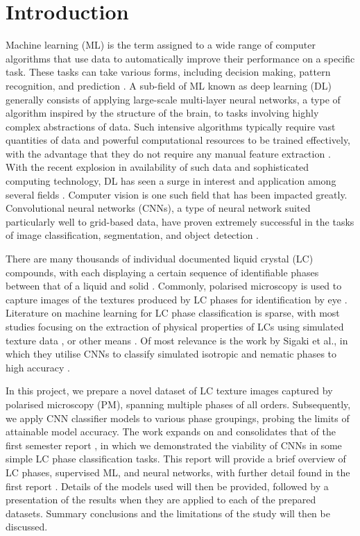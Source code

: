 \documentclass[12pt]{article}
\begin{document}
\section{Introduction}
Machine learning (ML) is the term assigned to a wide range of computer algorithms that use data to automatically improve their performance on a specific task. These tasks can take various forms, including decision making, pattern recognition, and prediction  \cite{Murphy12}. A sub-field of ML known as deep learning (DL) generally consists of applying large-scale multi-layer neural networks, a type of algorithm inspired by the structure of the brain, to tasks involving highly complex abstractions of data. Such intensive algorithms typically require vast quantities of data and powerful computational resources to be trained effectively, with the advantage that they do not require any manual feature extraction \cite{Goodfellow16}. With the recent explosion in availability of such data and sophisticated computing technology, DL has seen a surge in interest and application among several fields \cite{Shrestha19}. Computer vision is one such field that has been impacted greatly. Convolutional neural networks (CNNs), a type of neural network suited particularly well to grid-based data, have proven extremely successful in the tasks of image classification, segmentation, and object detection \cite{Voulodimos18}.

There are many thousands of individual documented liquid crystal (LC) compounds, with each displaying a certain sequence of identifiable phases between that of a liquid and solid \cite{Dierking03}. Commonly, polarised microscopy is used to capture images of the textures produced by LC phases for identification by eye \cite{Dierking03}. Literature on machine learning for LC phase classification is sparse, with most studies focusing on the extraction of physical properties of LCs using simulated texture data \cite{Sigaki20, Sigaki19, Minor20, Walters19}, or other means \cite{Florin07, Butnariu13, Doi19, Inokuchi20}. Of most relevance is the work by Sigaki et al., in which they utilise CNNs to classify simulated isotropic and nematic phases to high accuracy \cite{Sigaki20}.

In this project, we prepare a novel dataset of LC texture images captured by polarised microscopy (PM), spanning multiple phases of all orders. Subsequently, we apply CNN classifier models to various phase groupings, probing the limits of attainable model accuracy. The work expands on and consolidates that of the first semester report \cite{Heaton20}, in which we demonstrated the viability of CNNs in some simple LC phase classification tasks. This report will provide a brief overview of LC phases, supervised ML, and neural networks, with further detail found in the first report \cite{Heaton20}. Details of the models used will then be provided, followed by a presentation of the results when they are applied to each of the prepared datasets. Summary conclusions and the limitations of the study will then be discussed.
\end{document}
